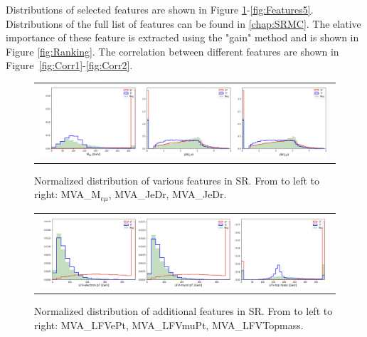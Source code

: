 \begin{table}[th]
\sffamily
\centering
\caption{Features only used by \ac{BDT} trained in \ac{SR}2}
\label{tab:SR2Features}
\end{table}

Distributions of selected features are shown in Figure \ref{fig:Features1}-\ref{fig:Features5}. Distributions of the full list of features can be found in \autoref{chap:SRMC}. The elative importance of these feature is extracted using the "gain" method and is shown in Figure \ref{fig:Ranking}. The correlation between different features are shown in Figure~\ref{fig:Corr1}-\ref{fig:Corr2}.

\begin{figure}[tbh!]
 \begin{center}
 \begin{tabular}{c}
  \includegraphics[width=0.99\textwidth]{figures/Part3/BDT/Features1}\\
 \end{tabular}
 \caption{Normalized distribution of various features in SR. From to left to right: MVA\_M$_{e\mu}$, MVA\_JeDr, MVA\_JeDr.}
 \label{fig:Features1}
 \end{center}
\end{figure}

\begin{figure}[tbh!]
 \begin{center}
 \begin{tabular}{c}
  \includegraphics[width=0.99\textwidth]{figures/Part3/BDT/Features2}\\
 \end{tabular}
 \caption{Normalized distribution of additional features in SR. From to left to right: MVA\_LFVePt, MVA\_LFVmuPt, MVA\_LFVTopmass.}
 \label{fig:Features2}
 \end{center}
\end{figure}

